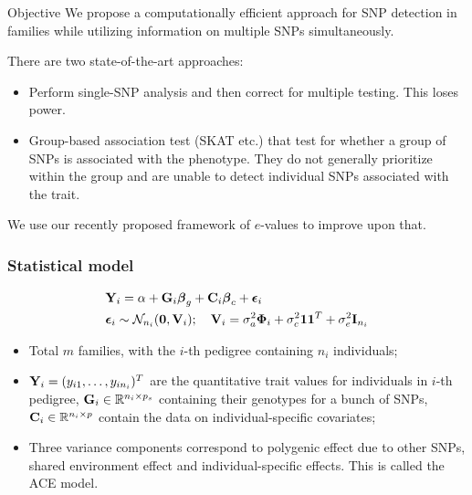 \documentclass[handout,10pt]{beamer}
\begin{document}
\begin{frame}{Objective}
We propose a computationally efficient approach for SNP detection in families while utilizing information on multiple SNPs simultaneously.

\vspace{1em}
There are two state-of-the-art approaches:

\begin{itemize}
\item Perform single-SNP analysis and then correct for multiple testing. This loses power.

\item Group-based association test (SKAT etc.) that test for whether a group of SNPs is associated with the phenotype. They do not generally prioritize within the group and are unable to detect individual SNPs associated with the trait.
\end{itemize}

We use our recently proposed framework of $e$-values to improve upon that.
\end{frame}


\begin{frame}
\frametitle{Statistical model}
%
\begin{align*}
& {\mathbf{Y}}_i = \alpha + {\mathbf{G}}_i {\boldsymbol{\beta}}_g + {\mathbf{C}}_i {\boldsymbol{\beta}}_c + {\boldsymbol{\epsilon}}_i\\
& {\boldsymbol{\epsilon}}_i \sim {\cal{N}}_{n_i} ({\bf 0}, {\mathbf{V}}_i); \quad {\mathbf{V}}_i = \sigma_a^2 {\boldsymbol{\Phi}}_i + \sigma_c^2 {\bf 1} {\bf 1}^T + \sigma_e^2 {\mathbf{I}}_{n_i}
\end{align*}
%

\begin{itemize}

\item Total $m$ families, with the $i$-th pedigree containing $n_i$ individuals;

\vspace{1em}
\item ${\mathbf{Y}}_i = (y_{i 1}, \ldots, y_{i n_i})^T $ are the quantitative trait values for individuals in $i$-th pedigree, ${\mathbf{G}}_i \in {\mathbb{R}}^{ n_i \times p_s}$ containing their genotypes for a bunch of SNPs, ${\mathbf{C}}_i \in {\mathbb{R}}^{ n_i \times p}$ contain the data on individual-specific covariates;

\vspace{1em}
\item Three variance components correspond to polygenic effect due to other SNPs, shared environment effect and individual-specific effects. This is called the {\colbbf ACE model}.

\end{itemize}

\end{frame}
\end{document}

